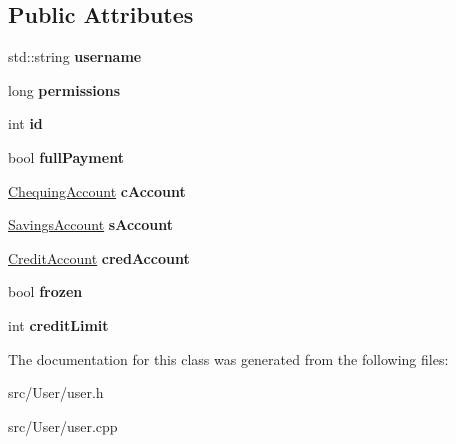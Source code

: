 \subsection*{Public Attributes}
\begin{DoxyCompactItemize}
\item 
\hypertarget{classUser_1_1User_ac5858cf6e84e849b376862bf3b499702}{std\-::string {\bfseries username}}\label{classUser_1_1User_ac5858cf6e84e849b376862bf3b499702}

\item 
\hypertarget{classUser_1_1User_a3d945f509a0b28e0e5ed941b0d7b6a3a}{long {\bfseries permissions}}\label{classUser_1_1User_a3d945f509a0b28e0e5ed941b0d7b6a3a}

\item 
\hypertarget{classUser_1_1User_aa5cb0568ede3fa868173c2205f2d9296}{int {\bfseries id}}\label{classUser_1_1User_aa5cb0568ede3fa868173c2205f2d9296}

\item 
\hypertarget{classUser_1_1User_a3fb0c02b27de8a8593390ff476dd2483}{bool {\bfseries full\-Payment}}\label{classUser_1_1User_a3fb0c02b27de8a8593390ff476dd2483}

\item 
\hypertarget{classUser_1_1User_a1484e91101276d650e49c206730c2bb4}{\hyperlink{classChequingAccount}{Chequing\-Account} {\bfseries c\-Account}}\label{classUser_1_1User_a1484e91101276d650e49c206730c2bb4}

\item 
\hypertarget{classUser_1_1User_a2fb771418192be09c4458839ef097a52}{\hyperlink{classSavingsAccount}{Savings\-Account} {\bfseries s\-Account}}\label{classUser_1_1User_a2fb771418192be09c4458839ef097a52}

\item 
\hypertarget{classUser_1_1User_a51288924b7ef4375d13fbcc11ba62d20}{\hyperlink{classCreditAccount}{Credit\-Account} {\bfseries cred\-Account}}\label{classUser_1_1User_a51288924b7ef4375d13fbcc11ba62d20}

\item 
\hypertarget{classUser_1_1User_a1b23e9e4356623275c39fe437d501a83}{bool {\bfseries frozen}}\label{classUser_1_1User_a1b23e9e4356623275c39fe437d501a83}

\item 
\hypertarget{classUser_1_1User_abb60a21da252bfa75064d3b98dfc2b11}{int {\bfseries credit\-Limit}}\label{classUser_1_1User_abb60a21da252bfa75064d3b98dfc2b11}

\end{DoxyCompactItemize}


The documentation for this class was generated from the following files\-:\begin{DoxyCompactItemize}
\item 
src/\-User/user.\-h\item 
src/\-User/user.\-cpp\end{DoxyCompactItemize}
